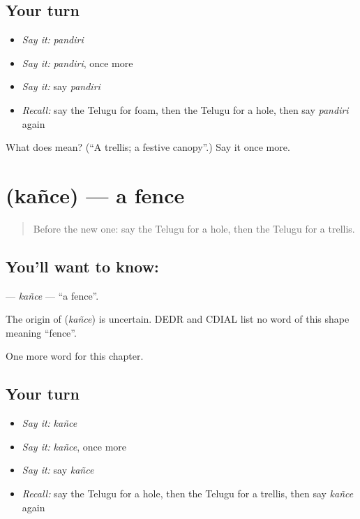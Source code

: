 \subsection*{Your turn}
\begin{itemize}
\raggedright
  \item \emph{Say it:} \emph{pandiri}
  \item \emph{Say it:} \emph{pandiri}, once more
  \item \emph{Say it:} say \emph{pandiri}
  \item \emph{Recall:} say the Telugu for foam, then the Telugu for a hole, then say \emph{pandiri} again
\end{itemize}

\begin{tcolorbox}[breakable,colback=teal!4,colframe=teal!35!black,title={Before you move on}]
What does  mean? (\textquotedblleft{}A trellis; a festive canopy\textquotedblright{}.) Say it once more.
\end{tcolorbox}
\section[\texorpdfstring{\te{కంచె} (kañce)}{కంచె (kañce)}]{ (kañce) — a fence}

\label{lesson:TE-C272-kance}



\begin{quote}
Before the new one: say the Telugu for a hole, then the Telugu for a trellis.
\end{quote}

\subsection*{You'll want to know: }
\textbf{} — \emph{kañce} — \textquotedblleft{}a fence\textquotedblright{}.

\begin{cousinweb}
The origin of \textbf{} (\emph{kañce}) is uncertain. DEDR and CDIAL list no word of this shape meaning \textquotedblleft{}fence\textquotedblright{}.
\end{cousinweb}

\begin{grammarlens}[title={What you've built}]
One more word for this chapter.
\end{grammarlens}

\subsection*{Your turn}
\begin{itemize}
\raggedright
  \item \emph{Say it:} \emph{kañce}
  \item \emph{Say it:} \emph{kañce}, once more
  \item \emph{Say it:} say \emph{kañce}
  \item \emph{Recall:} say the Telugu for a hole, then the Telugu for a trellis, then say \emph{kañce} again
\end{itemize}

